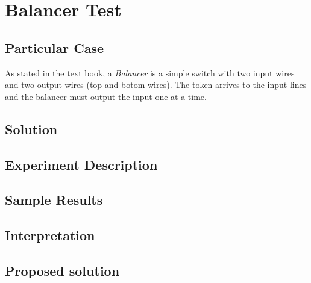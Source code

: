 \section{\textbf{Balancer Test}}
\subsection{Particular Case}
\par
As stated in the text book, a \textit{Balancer} is a simple switch with two input wires
and two output wires (top and botom wires). The token arrives to the input lines and the
balancer must output the input one at a time.
\par
\subsection{Solution}
\par
\par
\subsection{Experiment Description}
\par
\par
\subsection{Sample Results}
\par
\par
\subsection{Interpretation}
\par
\par
\subsection{Proposed solution}
\par

